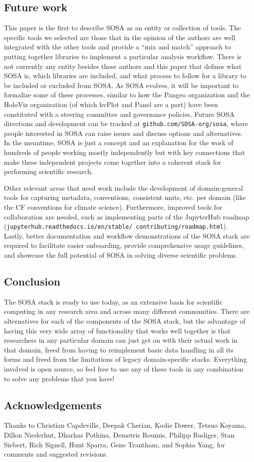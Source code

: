 \subsection{Future work}
This paper is the first to describe SOSA as an entity or collection of tools. The specific tools we selected are those that in the opinion of the authors are well integrated with the other tools and provide a ``mix and match'' approach to putting together libraries to implement a particular analysis workflow. There is not currently any entity besides these authors and this paper that defines what SOSA is, which libraries are included, and what process to follow for a library to be included or excluded from SOSA. As SOSA evolves, it will be important to formalize some of these processes, similar to how the Pangeo organization and the HoloViz organization (of which hvPlot and Panel are a part) have been constituted with a steering committee and governance policies. Future SOSA directions and development can be tracked at \texttt{github.com/SOSA-org/sosa}, where people interested in SOSA can raise issues and discuss options and alternatives. In the meantime, SOSA is just a concept and an explanation for the work of hundreds of people working mostly independently but with key connections that make these independent projects come together into a coherent stack for performing scientific research.

Other relevant areas that need work include the development of domain-general tools for capturing metadata, conventions, consistent units, etc. per domain (like the CF conventions for climate science). Furthermore, improved tools for collaboration are needed, such as implementing parts of the JupyterHub roadmap (\texttt{jupyterhub.readthedocs.io/en/stable/ contributing/roadmap.html}). Lastly, better documentation and workflow demonstrations of the SOSA stack are required to facilitate easier onboarding, provide comprehensive usage guidelines, and showcase the full potential of SOSA in solving diverse scientific problems.


\subsection{Conclusion}

The SOSA stack is ready to use today, as an extensive basis for scientific computing in any research area and across many different communities. There are alternatives for each of the components of the SOSA stack, but the advantage of having this very wide array of functionality that works well together is that researchers in any particular domain can just get on with their actual work in that domain, freed from having to reimplement basic data handling in all its forms and freed from the limitations of legacy domain-specific stacks. Everything involved is open source, so feel free to use any of these tools in any combination to solve any problems that you have!

\subsection{Acknowledgements}

Thanks to Christian Capdeville, Deepak Cherian, Kodie Dower, Tetsuo Koyama, Dillon Niederhut, Dharhas Pothina, Demetris Roumis, Philipp Rudiger, Stan Siebert, Rich Signell, Hunt Sparra, Gene Trantham, and  Sophia Yang, for comments and suggested revisions.
